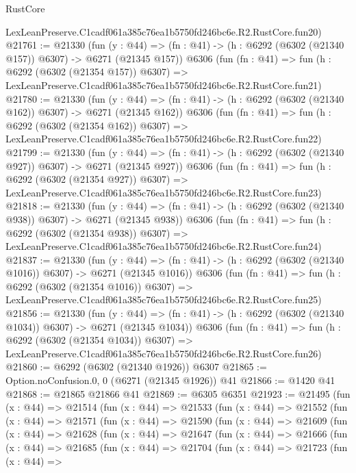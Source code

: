\begin{lexlean}{RustCore}
\begin{coremodule}
    LexLeanPreserve.C1cadf061a385c76ea1b5750fd246bc6e.R2.RustCore.fun20)
@21761 := @21330
    (fun (y : @44) => (fn : @41) -> (h : @6292 (@6302 (@21340 @157)) @6307) -> @6271 (@21345 @157))
    @6306
    (fun (fn : @41) =>
    fun (h : @6292 (@6302 (@21354 @157)) @6307) =>
    LexLeanPreserve.C1cadf061a385c76ea1b5750fd246bc6e.R2.RustCore.fun21)
@21780 := @21330
    (fun (y : @44) => (fn : @41) -> (h : @6292 (@6302 (@21340 @162)) @6307) -> @6271 (@21345 @162))
    @6306
    (fun (fn : @41) =>
    fun (h : @6292 (@6302 (@21354 @162)) @6307) =>
    LexLeanPreserve.C1cadf061a385c76ea1b5750fd246bc6e.R2.RustCore.fun22)
@21799 := @21330
    (fun (y : @44) => (fn : @41) -> (h : @6292 (@6302 (@21340 @927)) @6307) -> @6271 (@21345 @927))
    @6306
    (fun (fn : @41) =>
    fun (h : @6292 (@6302 (@21354 @927)) @6307) =>
    LexLeanPreserve.C1cadf061a385c76ea1b5750fd246bc6e.R2.RustCore.fun23)
@21818 := @21330
    (fun (y : @44) => (fn : @41) -> (h : @6292 (@6302 (@21340 @938)) @6307) -> @6271 (@21345 @938))
    @6306
    (fun (fn : @41) =>
    fun (h : @6292 (@6302 (@21354 @938)) @6307) =>
    LexLeanPreserve.C1cadf061a385c76ea1b5750fd246bc6e.R2.RustCore.fun24)
@21837 := @21330
    (fun (y : @44) =>
    (fn : @41) -> (h : @6292 (@6302 (@21340 @1016)) @6307) -> @6271 (@21345 @1016))
    @6306
    (fun (fn : @41) =>
    fun (h : @6292 (@6302 (@21354 @1016)) @6307) =>
    LexLeanPreserve.C1cadf061a385c76ea1b5750fd246bc6e.R2.RustCore.fun25)
@21856 := @21330
    (fun (y : @44) =>
    (fn : @41) -> (h : @6292 (@6302 (@21340 @1034)) @6307) -> @6271 (@21345 @1034))
    @6306
    (fun (fn : @41) =>
    fun (h : @6292 (@6302 (@21354 @1034)) @6307) =>
    LexLeanPreserve.C1cadf061a385c76ea1b5750fd246bc6e.R2.RustCore.fun26)
@21860 := @6292 (@6302 (@21340 @1926)) @6307
@21865 := Option.noConfusion.{0, 0} (@6271 (@21345 @1926)) @41
@21866 := @1420 @41
@21868 := @21865 @21866 @41
@21869 := @6305 @6351
@21923 := @21495
    (fun (x : @44) =>
    @21514
      (fun (x : @44) =>
      @21533
        (fun (x : @44) =>
        @21552
          (fun (x : @44) =>
          @21571
            (fun (x : @44) =>
            @21590
              (fun (x : @44) =>
              @21609
                (fun (x : @44) =>
                @21628
                  (fun (x : @44) =>
                  @21647
                    (fun (x : @44) =>
                    @21666
                      (fun (x : @44) =>
                      @21685
                        (fun (x : @44) =>
                        @21704
                          (fun (x : @44) =>
                          @21723
                            (fun (x : @44) =>

\end{coremodule}
\end{lexlean}
